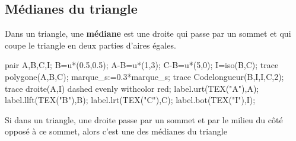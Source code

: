 \begin{changemargin}{0mm}{-15mm}
    \section{Médianes du triangle}
    \begin{minipage}{0.6\linewidth}
        \begin{propriete}
            Dans un triangle, une \textbf{médiane} est une droite qui passe par un sommet et qui coupe le triangle en deux parties d'aires égales.
        \end{propriete}
    \end{minipage}
    \begin{minipage}{0.4\linewidth}
        \begin{Geometrie}[CoinHD={(6.5u,4u)}]
            pair A,B,C,I;
            B=u*(0.5,0.5);
            A-B=u*(1,3);
            C-B=u*(5,0);
            I=iso(B,C);
            trace polygone(A,B,C);
            marque_s:=0.3*marque_s;
            trace Codelongueur(B,I,I,C,2);
            trace droite(A,I) dashed evenly withcolor red;
            label.urt(TEX("A"),A);
            label.llft(TEX("B"),B);
            label.lrt(TEX("C"),C);
            label.bot(TEX("I"),I);
        \end{Geometrie}
    \end{minipage}
    \begin{propriete}[\admise]
        Si dans un triangle, une droite passe par un sommet et par le milieu du côté opposé à ce sommet, alors c'est une des médianes du triangle
    \end{propriete}
    \begin{preuve}


\end{preuve}
\end{changemargin}
